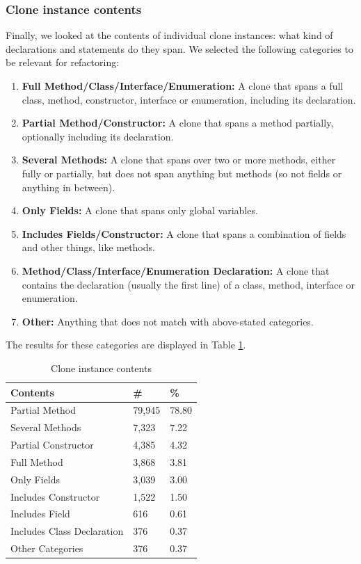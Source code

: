 \documentclass[a4paper]{article}
\begin{document}
\subsubsection{Clone instance contents}\label{chap:clonecontents}
Finally, we looked at the contents of individual clone instances: what kind of declarations and statements do they span. We selected the following categories to be relevant for refactoring:
\begin{enumerate}
  \item \textbf{Full Method/Class/Interface/Enumeration:} A clone that spans a full class, method, constructor, interface or enumeration, including its declaration.
  \item \textbf{Partial Method/Constructor:} A clone that spans a method partially, optionally including its declaration.
  \item \textbf{Several Methods:} A clone that spans over two or more methods, either fully or partially, but does not span anything but methods (so not fields or anything in between).
  \item \textbf{Only Fields:} A clone that spans only global variables.
  \item \textbf{Includes Fields/Constructor:} A clone that spans a combination of fields and other things, like methods.
  \item \textbf{Method/Class/Interface/Enumeration Declaration:} A clone that contains the declaration (usually the first line) of a class, method, interface or enumeration.
  \item \textbf{Other:} Anything that does not match with above-stated categories.
\end{enumerate}

The results for these categories are displayed in Table \ref{table:contents}.

\begin{table}[H]
  \begin{center}
  \caption{Clone instance contents} \label{table:contents}
  \medskip
\begin{tabular}{|l|l|l|}
  \hline
  \textbf{Contents} & \textbf{\#} & \textbf{\%} \\ \hline
  Partial Method     & 79,945 & 78.80 \\ \hline
  Several Methods         & 7,323 & 7.22 \\ \hline
  Partial Constructor      & 4,385 & 4.32 \\ \hline
  Full Method           & 3,868 & 3.81 \\ \hline
  Only Fields           & 3,039 & 3.00 \\ \hline
  Includes Constructor  & 1,522 & 1.50 \\ \hline
  Includes Field        & 616 & 0.61 \\ \hline
  Includes Class Declaration  & 376 & 0.37 \\ \hline
  Other Categories    & 376 & 0.37\\ \hline
\end{tabular}
\end{center}
\end{table}
\end{document}
